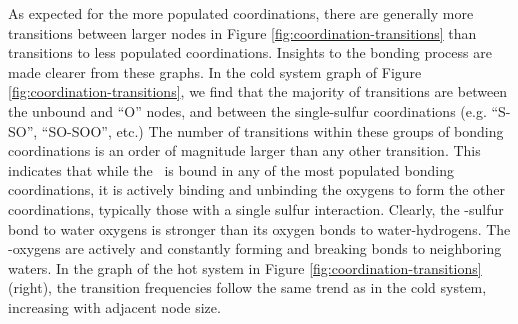 \documentclass{article}
\begin{document}
As expected for the more populated coordinations, there are generally more transitions between larger nodes in Figure \ref{fig:coordination-transitions} than transitions to less populated coordinations. Insights to the bonding process are made clearer from these graphs. In the cold system graph of Figure \ref{fig:coordination-transitions}, we find that the majority of transitions are between the unbound and ``O'' nodes, and between the single-sulfur coordinations (e.g. ``S-SO'', ``SO-SOO'', etc.) The number of transitions within these groups of bonding coordinations is an order of magnitude larger than any other transition. This indicates that while the \suldiox~is bound in any of the most populated bonding coordinations, it is actively binding and unbinding the oxygens to form the other coordinations, typically those with a single sulfur interaction. Clearly, the \suldiox-sulfur bond to water oxygens is stronger than its oxygen bonds to water-hydrogens. The \suldiox-oxygens are actively and constantly forming and breaking bonds to neighboring waters. In the graph of the hot system in Figure \ref{fig:coordination-transitions} (right), the transition frequencies follow the same trend as in the cold system, increasing with adjacent node size. %
\end{document}

